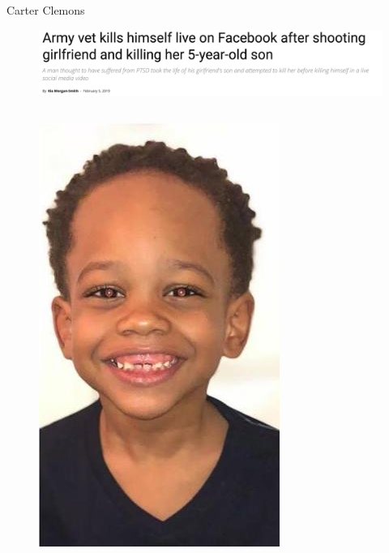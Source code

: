 \documentclass[nobackground,dvipsnames,table]{beamer}
\begin{document}
\begin{frame}{Carter Clemons}
    \begin{figure}
        \centering
        \includegraphics[width=\textwidth]{carter-clemons-news}
    \end{figure}
    \begin{columns}
            \begin{figure}
                \centering
                \includegraphics[height=0.6\textheight]{carter-clemons-son}
            \end{figure}
            \begin{figure}
                \centering

\end{figure}
\end{columns}
\end{frame}
\end{document}
